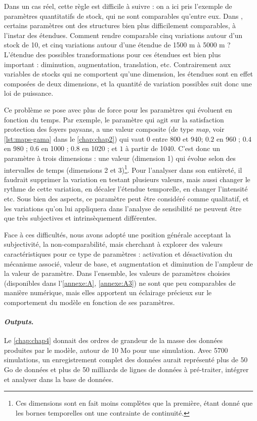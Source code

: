 Dans un cas réel, cette règle est difficile à suivre : on a ici pris l'exemple de paramètres quantitatifs \og de stock\fg{}, qui ne sont comparables qu'entre eux.
Dans \simfeodal{}, certains paramètres ont des structures bien plus difficilement comparables, à l'instar des étendues.
Comment rendre comparable cinq variations autour d'un stock de 10, et cinq variations autour d'une étendue de 1500 m à 5000 m ?
L'étendue des possibles transformations pour ces étendues est bien plus important : diminution, augmentation, translation, etc.
Contrairement aux variables de stocks qui ne comportent qu'une dimension, les étendues sont en effet composées de deux dimensions, et la quantité de variation possibles suit donc une loi de puissance.

Ce problème se pose avec plus de force pour les paramètres qui évoluent en fonction du temps.
Par exemple, le paramètre qui agit sur la satisfaction protection des foyers paysans, a une valeur composite (de type \textit{map}, voir \cref{lst:maps-gama} dans le \cref{chap:chap2}) qui vaut \og $0$ entre 800 et 940; $0.2$ en 960 ; $0.4$ en 980 ; $0.6$ en 1000 ; $0.8$ en 1020 ; et $1$ à partir de 1040\fg{}.
C'est donc un paramètre à trois dimensions : une valeur (dimension 1) qui évolue selon des intervalles de temps (dimensions 2 et 3)\footnote{
	Ces dimensions sont en fait moins \og complètes\fg{} que la première, étant donné que les bornes temporelles ont une contrainte de continuité.
}.
Pour l'analyser dans son entièreté, il faudrait supprimer la variation en testant plusieurs valeurs, mais aussi changer le rythme de cette variation, en décaler l'étendue temporelle, en changer l'intensité etc.
Sous bien des aspects, ce paramètre peut être considéré comme qualitatif, et les variations qu'on lui appliquera dans l'analyse de sensibilité ne peuvent être que très subjectives et intrinsèquement différentes.

Face à ces difficultés, nous avons adopté une position générale acceptant la subjectivité, la non-comparabilité, mais cherchant à explorer des valeurs \og caractéristiques\fg{} pour ce type de paramètres : activation et désactivation du mécanisme associé, valeur de base, et augmentation et diminution de l'ampleur de la valeur de paramètre.
Dans l'ensemble, les valeurs de paramètres choisies (disponibles dans l'\cref{annexe:A}, \cref{annexe:A3}) ne sont que peu comparables de manière numérique, mais elles apportent un éclairage précieux sur le comportement du modèle en fonction de ses paramètres.

\paragraph{\textit{Outputs}.}
Le \cref{chap:chap4} donnait des ordres de grandeur de la masse des données produites par le modèle, autour de 10 Mo pour une simulation.
Avec 5700 simulations, un enregistrement complet des données aurait représenté plus de 50 Go de données et plus de 50 milliards de lignes de données à pré-traiter, intégrer et analyser dans la base de données.

